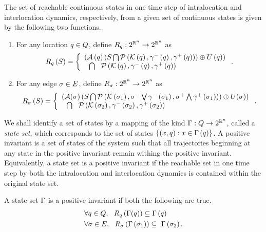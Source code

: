 The set of reachable continuous states in one time step of
intralocation and interlocation dynamics, respectively, from a given
set of continuous states is given by the following two functions.
\begin{enumerate}
\item For any location $q\in Q$, define $R_{q}:2^{\mathbb{R}^n}\rightarrow 2^{\mathbb{R}^n}$ as
\begin{equation*}
R_{q}\left(S\right) = \left\{\begin{array}{l}{\left(\mathcal{A}\left(q\right)\left(S\bigcap\mathcal{P}\left(\mathcal{K}\left(q\right),\gamma^-\left(q\right),\gamma^+\left(q\right)\right)\right)\oplus
U\left(q\right)\right)}\\{~~\bigcap~~\mathcal{P}\left(\mathcal{K}\left(q\right),\gamma^-\left(q\right),\gamma^+\left(q\right)\right)} \end{array}\right..
\end{equation*}
\item For any edge $\sigma\in E$, define
  $R_{\sigma}:2^{\mathbb{R}^n}\rightarrow 2^{\mathbb{R}^n}$ as
\begin{multline*}
R_{\sigma}\left(S\right) =  \left\{\begin{array}{l}{\left(\mathcal{A}(\sigma)\left(S\bigcap
\mathcal{P}\left(\mathcal{K}\left(\sigma_{1}\right),\sigma^-\bigvee\gamma^-\left(\sigma_{1}\right),\sigma^+\bigwedge\gamma^+\left(\sigma_{1}\right)\right)\right)\oplus U(\sigma)\right)}\\{~~\bigcap~~\mathcal{P}\left(\mathcal{K}\left(\sigma_{2}\right),\gamma^-\left(\sigma_{2}\right),\gamma^+\left(\sigma_{2}\right)\right)} \end{array}\right..
\end{multline*}
\end{enumerate}

We shall identify a set of states by a mapping of the kind
$\Gamma:Q\rightarrow 2^{\mathbb{R}^n}$, called a \emph{state
  set}, which corresponds to the set of states
$\left\{\left(x,q\right):x\in\Gamma\left(q\right)\right\}$.  A positive
invariant is a set of states of the system such that all trajectories
beginning at any state in the positive invariant remain withing the
positive invariant.  Equivalently, a state set is a positive invariant
if the reachable set in one time step by both the intralocation and
interlocation dynamics is contained within the original state set.
\begin{definition}
A state set $\Gamma$ is a positive invariant if
both the following are true.
\begin{align}
& \forall q\in Q,~~R_{q}\left(\Gamma(q)\right) \subseteq \Gamma\left(q\right)~\label{eqn:pi1}\\
& \forall\sigma\in E,~~R_{\sigma}\left(\Gamma\left(\sigma_{1}\right)\right) \subseteq~\label{eqn:pi2}
  \Gamma\left(\sigma_{2}\right).
\end{align}
\end{definition}
